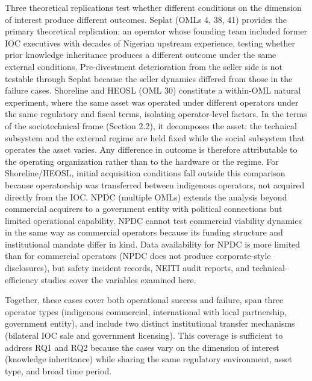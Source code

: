 Three theoretical replications test whether different conditions on the
dimension of interest produce different outcomes. Seplat (OMLs 4, 38,
41) provides the primary theoretical replication: an operator whose
founding team included former IOC executives with decades of Nigerian
upstream experience, testing whether prior knowledge inheritance
produces a different outcome under the same external conditions.
Pre-divestment deterioration from the seller side is not testable
through Seplat because the seller dynamics differed from those in the
failure cases. Shoreline and HEOSL (OML 30) constitute a within-OML
natural experiment, where the same asset was operated under different
operators under the same regulatory and fiscal terms, isolating
operator-level factors. In the terms of the sociotechnical frame
(Section 2.2), it decomposes the asset: the technical subsystem and the
external regime are held fixed while the social subsystem that operates
the asset varies. Any difference in outcome is therefore attributable to
the operating organization rather than to the hardware or the regime.
For Shoreline/HEOSL, initial acquisition conditions fall outside this
comparison because operatorship was transferred between indigenous
operators, not acquired directly from the IOC. NPDC (multiple OMLs)
extends the analysis beyond commercial acquirers to a government entity
with political connections but limited operational capability. NPDC
cannot test commercial viability dynamics in the same way as commercial
operators because its funding structure and institutional mandate differ
in kind. Data availability for NPDC is more limited than for commercial
operators (NPDC does not produce corporate-style disclosures), but
safety incident records, NEITI audit reports, and technical-efficiency
studies cover the variables examined here.

Together, these cases cover both operational success and failure, span
three operator types (indigenous commercial, international with local
partnership, government entity), and include two distinct institutional
transfer mechanisms (bilateral IOC sale and government licensing). This
coverage is sufficient to address RQ1 and RQ2 because the cases vary on
the dimension of interest (knowledge inheritance) while sharing the same
regulatory environment, asset type, and broad time period.

